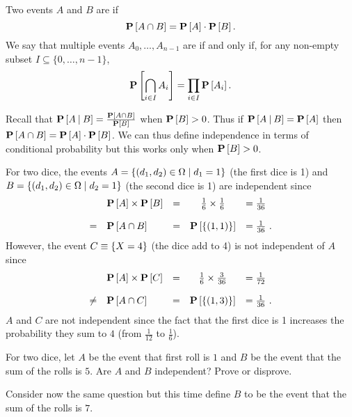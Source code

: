   
\begin{definition}[Independence]
Two events $A$ and $B$ are    if 
\[
\mathbf{P}\left[{A \cap B}\right] = \mathbf{P}\left[{A}\right] \cdot \mathbf{P}\left[{B}\right].
\]  
%
We say that multiple events $A_0, \dots, A_{n-1}$  are  if and only if, for any non-empty subset $I \subseteq \{0, \dots, n-1\}$,
\[
\mathbf{P}\left[{\bigcap_{i \in I} A_i}\right] = \prod_{i\in I} \mathbf{P}\left[{A_i}\right].
\]
\end{definition}

\begin{flex}

\begin{gram}
Recall that  $\mathbf{P}\left[{A {\:\mid\:} B}\right] = \frac{\mathbf{P}\left[{A \cap
    B}\right]}{\mathbf{P}\left[{B}\right]}$ when $\mathbf{P}\left[{B}\right] > 0$. Thus if $\mathbf{P}\left[{A {\:\mid\:} B}\right] = \mathbf{P}\left[{A}\right]$ then
 $\mathbf{P}\left[{A \cap B}\right] = \mathbf{P}\left[{A}\right] \cdot \mathbf{P}\left[{B}\right]$.
%
We can thus define independence in terms of conditional probability
but this works only when $\mathbf{P}\left[{B}\right] > 0$. 
\end{gram}

\begin{example}
For two dice, the events $A = \left\{ (d_1,d_2) \in
  \Omega \;|\; d_1=1 \right\}$ (the first dice is 1) and $B = \left\{ (d_1,d_2) \in
  \Omega \;|\; d_2=1 \right\}$ (the second dice is 1) are independent since
%
\[
\begin{array}{llccl}\
& \mathbf{P}\left[{A}\right] \times \mathbf{P}\left[{B}\right] & = & \frac{1}{6} \times \frac{1}{6} & = \frac{1}{36} \\[4mm]
= & \mathbf{P}\left[{A \cap B}\right] & = & \mathbf{P}\left[{\left\{ (1,1) \right\}}\right] & = \frac{1}{36}~.
\end{array}
\]
%
However, the event $C \equiv \{X =4\}$ (the dice add to 4) is not independent of $A$
since 
\[
\begin{array}{llccl}
& \mathbf{P}\left[{A}\right] \times \mathbf{P}\left[{C}\right] & = &\frac{1}{6} \times \frac{3}{36} & = \frac{1}{72} \\[4mm]
\neq & \mathbf{P}\left[{A \cap C}\right] & = & \mathbf{P}\left[{\left\{ (1,3) \right\}}\right] & = \frac{1}{36}~.
\end{array}
\]
$A$ and $C$ are not
independent since the fact that the first dice is 1 increases the
probability they sum to $4$ (from $\frac{1}{12}$ to $\frac{1}{6}$).

\end{example}
\end{flex}

\begin{exercise}
For two dice, let $A$ be the event that first roll is $1$ and $B$ be
the event that the sum of the rolls is $5$.
Are $A$ and $B$ independent?  Prove or disprove.

Consider now the same question but this time define $B$ to be the
event that the sum of the rolls is $7$.  
\end{exercise}


